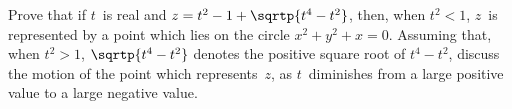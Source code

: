 Prove that if $t$~is real and $z = t^{2} - 1 + \sqrtp{t^{4} - t^{2}}$, then, when $t^{2} < 1$, $z$~is
represented by a point which lies on the circle $x^{2} + y^{2} + x = 0$. Assuming that,
when $t^{2} > 1$, $\sqrtp{t^{4} - t^{2}}$ denotes the positive square root of $t^{4} - t^{2}$, discuss the
motion of the point which represents~$z$, as $t$~diminishes from a large positive
value to a large negative value. 

